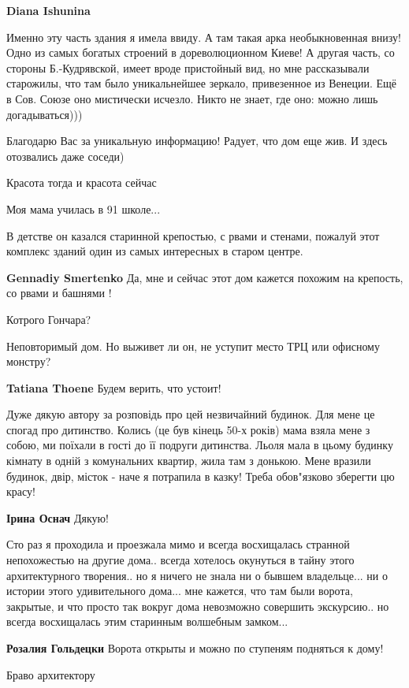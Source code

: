 \begin{itemize}
\begin{itemize}
\begin{itemize}
\textbf{Diana Ishunina} 

Именно эту часть здания я имела ввиду. А там такая арка необыкновенная внизу!
Одно из самых богатых строений в дореволюционном Киеве! А другая часть, со
стороны Б.-Кудрявской, имеет вроде пристойный вид, но мне рассказывали
старожилы, что там было уникальнейшее зеркало, привезенное из Венеции. Ещё в
Сов. Союзе оно мистически исчезло. Никто не знает, где оно: можно лишь
догадываться)))

\end{itemize} %

\end{itemize} %


Благодарю Вас за уникальную информацию!
Радует, что дом еще жив. И здесь отозвались даже соседи)

Красота тогда и красота сейчас

Моя мама училась в 91 школе...


В детстве он казался старинной крепостью, с рвами и стенами, пожалуй этот
комплекс зданий один из самых интересных в старом центре.


\textbf{Gennadiy Smertenko} Да, мне и сейчас этот дом кажется похожим на крепость, со рвами и башнями !

Котрого Гончара?

Неповторимый дом. Но выживет ли он, не уступит место ТРЦ или офисному монстру?

\textbf{Tatiana Thoene} Будем верить, что устоит!


Дуже дякую автору за розповідь про цей незвичайний будинок. Для мене це спогад
про дитинство. Колись (це був кінець 50-х років) мама взяла мене з собою, ми
поїхали в гості до її подруги дитинства. Льоля мала в цьому будинку кімнату в
одній з комунальних квартир, жила там з донькою. Мене вразили будинок, двір,
місток - наче я потрапила в казку! Треба обов"язково зберегти цю красу!

\textbf{Ірина Оснач} Дякую!


Сто раз я проходила и проезжала мимо и всегда восхищалась странной непохожестью
на другие дома.. всегда хотелось окунуться в тайну этого архитектурного
творения.. но я ничего не знала ни о бывшем владельце... ни о истории этого
удивительного дома... мне кажется, что там были ворота, закрытые, и что просто
так вокруг дома невозможно совершить экскурсию.. но всегда восхищалась этим
старинным волшебным замком...


\textbf{Розалия Гольдецки} Ворота открыты и можно по ступеням подняться к дому!

Браво архитектору

\end{itemize} %
